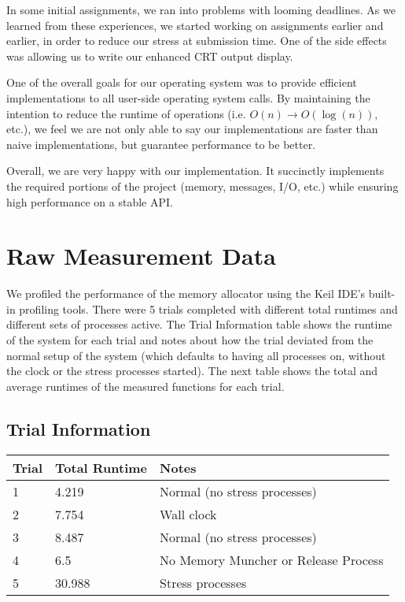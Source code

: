 \documentclass[12pt]{report}
\begin{document}
    In some initial assignments, we ran into problems with looming deadlines. As
    we learned from these experiences, we started working on assignments earlier
    and earlier, in order to reduce our stress at submission time. One of the
    side effects was allowing us to write our enhanced CRT output display.

    One of the overall goals for our operating system was to provide efficient
    implementations to all user-side operating system calls. By maintaining the
    intention to reduce the runtime of operations (i.e. $O(n) \to O(\log(n))$,
    etc.), we feel we are not only able to say our implementations are faster
    than naive implementations, but guarantee performance to be better.

    Overall, we are very happy with our implementation. It succinctly implements
    the required portions of the project (memory, messages, I/O, etc.) while
    ensuring high performance on a stable API.


\appendix
\chapter{Raw Measurement Data}
\label{appendix:raw_data}

We profiled the performance of the memory allocator using the Keil IDE's built-
in profiling tools.  There were 5 trials completed with different total runtimes
and different sets of  processes active. The Trial Information table shows the
runtime  of the system for each trial and notes about how the trial deviated
from the normal  setup of the system (which defaults to having all processes on,
without the clock  or the stress processes started). The next table shows the
total and average runtimes  of the measured functions for each trial.

\section{Trial Information}

\begin{tabular}{l | l | l}
    Trial&Total Runtime&Notes \\
    \hline
    1&4.219&Normal (no stress processes) \\
    2&7.754&Wall clock \\
    3&8.487&Normal (no stress processes)\\
    4&6.5&No Memory Muncher or Release Process \\
    5&30.988&Stress processes \\
\end{tabular}
\end{document}
